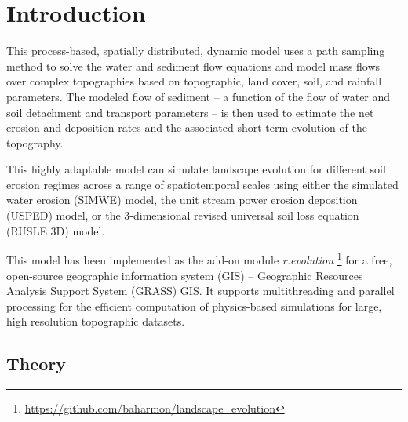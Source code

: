 \documentclass[final,3p,times,twocolumn]{elsarticle}
\begin{document}
\section{Introduction}
This process-based, spatially distributed, dynamic model uses a path sampling method to solve the water and sediment flow equations
\cite{mitasova2004}
and model mass flows over complex topographies based on topographic, land cover, soil, and rainfall parameters.
The modeled flow of sediment -- a function of the flow of water and soil detachment and transport parameters -- is then used to estimate the net erosion and deposition rates and the associated short-term evolution of the topography. 

This highly adaptable model can simulate landscape evolution 
for different soil erosion regimes
across a range of spatiotemporal scales
using either
the simulated water erosion (SIMWE) model, 
the unit stream power erosion deposition (USPED) model,
or the 3-dimensional revised universal soil loss equation (RUSLE 3D) model.  

This model has been implemented as the add-on module 
\textit{r.evolution}
\footnote{\url{https://github.com/baharmon/landscape\_evolution}}
for a free, open-source geographic information system (GIS) -- 
Geographic Resources Analysis Support System (GRASS) GIS. 
It supports multithreading and parallel processing
for the efficient computation of physics-based simulations 
for large, high resolution topographic datasets.

%
\subsection{Theory}
\end{document}
